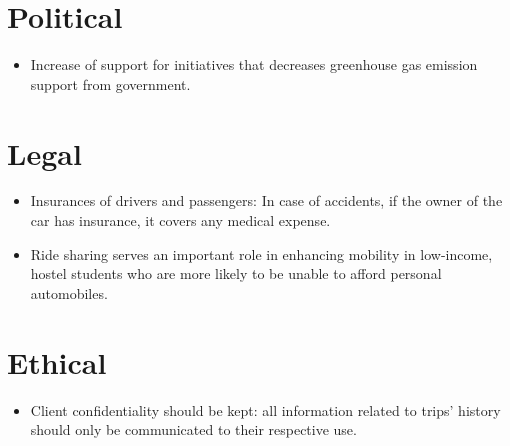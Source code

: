 \section*{Political}
\begin{itemize}
\item Increase of support for initiatives that decreases greenhouse gas emission support from government.
\end{itemize}

\section*{Legal}
\begin{itemize}
\item Insurances of drivers and passengers: In case of accidents, if the owner of the car has insurance, it covers any medical expense. 
\item Ride sharing serves an important role in enhancing mobility in low-income, hostel students who are more likely to be unable to afford personal automobiles.
\end{itemize}

\section*{Ethical}
\begin{itemize}
\item Client confidentiality should be kept: all information related to trips’ history should only be communicated to their respective use.
\end{itemize} 
  